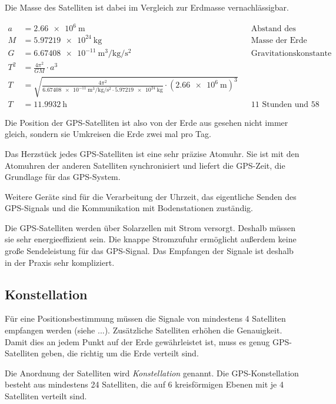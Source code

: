 \documentclass[12pt,a4paper]{scrartcl}
\begin{document}
Die Masse des Satelliten ist dabei im Vergleich zur Erdmasse vernachlässigbar.

\begin{align*}
a &= \SI{2.66e6}{\meter} && \text{Abstand des Satelliten}\\
M &= \SI{5.97219e24}{\kilo\gram} && \text{Masse der Erde}\\
G &= \SI{6.67408e-11}{\cubic\meter\per\kilo\gram\per\square\second} && \text{Gravitationskonstante} \\
T^2 &= \frac{4 \pi^2}{G M} \cdot a^3 \\
T &= \sqrt{\frac{4 \pi^2}{\SI{6.67408e-11}{\cubic\meter\per\kilo\gram\per\square\second} \cdot \SI{5.97219e24}{\kilo\gram}} \cdot (\SI{2.66e6}{\meter})^3} \\
T &= \SI{11.9932}{\hour} && \text{11 Stunden und 58 Minuten}
\end{align*}

Die Position der GPS-Satelliten ist also von der Erde aus gesehen nicht immer gleich, sondern sie Umkreisen die Erde zwei mal pro Tag.

Das Herzstück jedes GPS-Satelliten ist eine sehr präzise Atomuhr. Sie ist mit den Atomuhren der anderen Satelliten synchronisiert und liefert die GPS-Zeit, die Grundlage für das GPS-System.

Weitere Geräte sind für die Verarbeitung der Uhrzeit, das eigentliche Senden des GPS-Signals und die Kommunikation mit Bodenstationen zuständig.

Die GPS-Satelliten werden über Solarzellen mit Strom versorgt. Deshalb müssen sie sehr energieeffizient sein. Die knappe Stromzufuhr ermöglicht außerdem keine große Sendeleistung für das GPS-Signal. Das Empfangen der Signale ist deshalb in der Praxis sehr kompliziert.

\subsection{Konstellation}
Für eine Positionsbestimmung müssen die Signale von mindestens 4 Satelliten empfangen werden (siehe ...). Zusätzliche Satelliten erhöhen die Genauigkeit. Damit dies an jedem Punkt auf der Erde gewährleistet ist, muss es genug GPS-Satelliten geben, die richtig um die Erde verteilt sind.

Die Anordnung der Satelliten wird \emph{Konstellation} genannt. Die GPS-Konstellation besteht aus mindestens 24 Satelliten, die auf 6 kreisförmigen Ebenen mit je 4 Satelliten verteilt sind.
\end{document}
